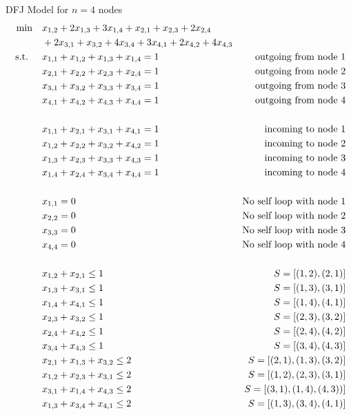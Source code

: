 \begin{example}{DFJ Model for $n=4$ nodes}{}
\begin{align*}
\min \quad & x_{1,2} + 2 x_{1,3} + 3 x_{1,4} + x_{2,1} + x_{2,3} + 2 x_{2,4} \\& + 2 x_{3,1} + x_{3,2} + 4 x_{3,4} + 3 x_{4,1} + 2 x_{4,2} + 4 x_{4,3}\\
\st \quad & x_{1,1} + x_{1,2} + x_{1,3} + x_{1,4} = 1& \text{ outgoing from node 1}\\
  & x_{2,1} + x_{2,2} + x_{2,3} + x_{2,4} = 1& \text{ outgoing from node 2}\\
 & x_{3,1} + x_{3,2} + x_{3,3} + x_{3,4} = 1& \text{ outgoing from node 3}\\
 & x_{4,1} + x_{4,2} + x_{4,3} + x_{4,4} = 1& \text{ outgoing from node 4}\\
 \\
  & x_{1,1} + x_{2,1} + x_{3,1} + x_{4,1} = 1& \text{ incoming to node 1}\\
 & x_{1,2} + x_{2,2} + x_{3,2} + x_{4,2} = 1& \text{ incoming to node 2}\\
 & x_{1,3} + x_{2,3} + x_{3,3} + x_{4,3} = 1& \text{ incoming to node 3}\\ 
 & x_{1,4} + x_{2,4} + x_{3,4} + x_{4,4} = 1& \text{ incoming to node 4}\\
 \\
 & x_{1,1} = 0 & \text{No self loop with node 1}\\
 & x_{2,2} = 0& \text{No self loop with node 2}\\
 & x_{3,3} = 0& \text{No self loop with node 3}\\
 & x_{4,4} = 0& \text{No self loop with node 4}\\
 \\
 & x_{1,2} + x_{2,1} \leq 1& S = [(1,2), (2,1)]\\
 & x_{1,3} + x_{3,1} \leq 1& S = [(1,3), (3,1)]\\
 & x_{1,4} + x_{4,1} \leq 1& S = [(1,4), (4,1)]\\
 & x_{2,3} + x_{3,2} \leq 1& S = [(2,3), (3,2)]\\
 & x_{2,4} + x_{4,2} \leq 1& S = [(2,4), (4,2)]\\
 & x_{3,4} + x_{4,3} \leq 1& S = [(3,4), (4,3)]\\
 & x_{2,1} + x_{1,3} + x_{3,2} \leq 2 & S = [(2,1), (1,3), (3,2)]\\
 & x_{1,2} + x_{2,3} + x_{3,1} \leq 2& S = [(1,2), (2,3), (3,1)]\\
 & x_{3,1} + x_{1,4} + x_{4,3} \leq 2& S = [(3,1), (1,4), (4,3))]\\
 & x_{1,3} + x_{3,4} + x_{4,1} \leq 2& S = [(1,3),(3,4), (4,1)]\\

\end{align*}
\end{example}
